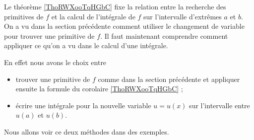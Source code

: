 Le théorème \ref{ThoRWXooTqHGbC} fixe la relation entre la recherche des primitives de \( f \) et la calcul de l'intégrale de \( f\) sur l'intervalle d'extrêmes \( a\) et \( b\). On a vu dans la section précédente comment utiliser le changement de variable pour trouver une primitive de \( f\). Il faut maintenant comprendre comment appliquer ce qu'on a vu dans le calcul d'une intégrale.

En effet nous avons le choix entre
\begin{itemize}
	\item trouver une primitive de \( f\) comme dans la section précédente et appliquer ensuite la formule du corolaire \ref{ThoRWXooTqHGbC} ;
	\item écrire une intégrale pour la nouvelle variable \( u = u(x)\) sur l'intervalle entre \( u(a)\) et \( u(b)\).
\end{itemize}

Nous allons voir ce deux méthodes dans des exemples.

